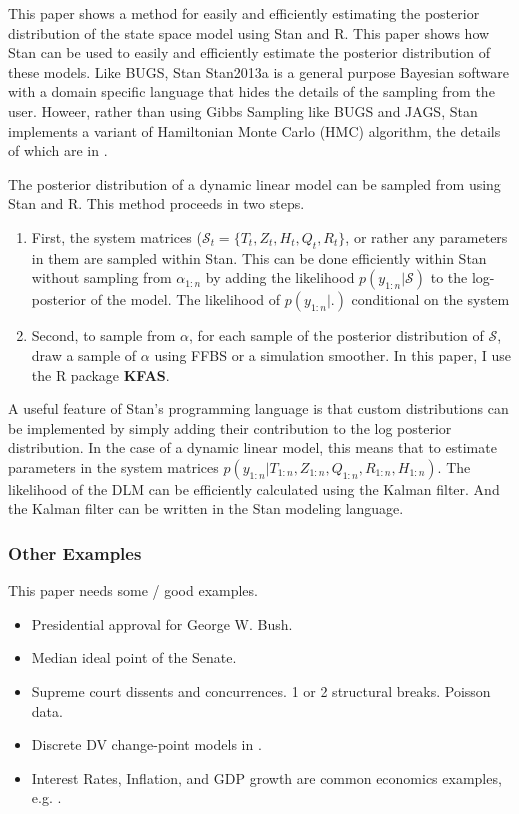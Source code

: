 \documentclass{article}
\begin{document}
This paper shows a method for easily and efficiently estimating the posterior distribution of the state space model using Stan and R.
This paper shows how Stan can be used to easily and efficiently estimate the posterior distribution of these models.
Like BUGS, Stan \textcite{Stan2013}{Stan2013a} is a general purpose Bayesian software with a domain specific language that hides the details of the sampling from the user.
Howeer, rather than using Gibbs Sampling like BUGS and JAGS, Stan implements a variant of Hamiltonian Monte Carlo (HMC) algorithm, the details of which are in \textcite{HoffmanGelman2013}.

The posterior distribution of a dynamic linear model can be sampled from using Stan and R.
This method proceeds in two steps.
\begin{enumerate}
\item First, the system matrices ($\mathcal{S}_{t} = \{T_{t}, Z_{t}, H_{t}, Q_{t}, R_{t}\}$, or rather any parameters in them are sampled within Stan. This can be done efficiently within Stan without sampling from $\alpha_{1:n}$ by adding the likelihood $p(y_{1:n} | \mathcal{S})$ to the log-posterior of the model.
The likelihood of $p(y_{1:n} | .)$ conditional on the system 
\item Second, to sample from $\alpha$, for each sample of the posterior distribution of $\mathcal{S}$, draw a sample of $\alpha$ using FFBS or a simulation smoother. In this paper, I use the R package \textbf{KFAS}.
\end{enumerate}

A useful feature of Stan's programming language is that custom distributions can be implemented by simply adding their contribution to the log posterior distribution.
In the case of a dynamic linear model, this means that to estimate parameters in the system matrices  $p(y_{1:n} | T_{1:n}, Z_{1:n}, Q_{1:n}, R_{1:n}, H_{1:n})$.
The likelihood of the DLM can be efficiently calculated using the Kalman filter. 
And the Kalman filter can be written in the Stan modeling language.

\subsubsection{Other Examples}

This paper needs some / good examples.

\begin{itemize}
\item Presidential approval for George W. Bush. \parencites{RatkovicEng2010}
\item Median ideal point of the Senate. \parencites{RatkovicEng2010}
\item Supreme court dissents and concurrences. 1 or 2 structural breaks. Poisson data. \parencite{CalderiaZorn1998}
\item Discrete DV change-point models in \parencite{spirling2007bayesian}.
\item Interest Rates, Inflation, and GDP growth are common economics examples, e.g. \textcite{GiordaniKohn2008}.
\end{itemize}
\end{document}
